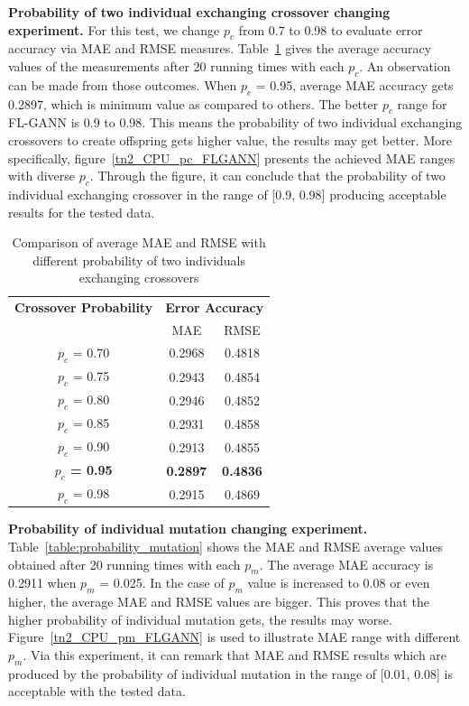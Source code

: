 \documentclass[conference]{IEEEtran}
\begin{document}
\textbf{Probability of two individual exchanging crossover changing experiment.} For this test, we change $p_c$ from 0.7 to 0.98 to evaluate error accuracy via MAE and RMSE measures. Table~\ref{table:probability_crossovers} gives the average accuracy values of the measurements after 20 running times with each $p_c$. An observation can be made from those outcomes. When $p_c$ = 0.95, average MAE accuracy gets 0.2897, which is minimum value as compared to others. The better $p_c$ range for FL-GANN is 0.9 to 0.98. This means the probability of two individual exchanging crossovers to create offspring gets higher value, the results may get better. More specifically, figure~\ref{tn2_CPU_pc_FLGANN} presents the achieved MAE ranges with diverse $p_c$. Through the figure, it can conclude that the probability of two individual exchanging crossover in the range of [0.9, 0.98] producing acceptable results for the tested data.

\begin{table}[h]
\caption{Comparison of average MAE and RMSE with different probability of two individuals exchanging crossovers} 
\begin{center}
\begin{tabular}{| c | c| c |}
\hline
\textbf{Crossover Probability} & \multicolumn{2}{c|}{\textbf{Error Accuracy}} \\ \cline{2-3} 
& MAE & RMSE \\ [0.5ex] \hline
$p_c$ = 0.70	& 0.2968	& 0.4818		\\ \hline
$p_c$ = 0.75	& 0.2943	& 0.4854	\\ \hline
$p_c$ = 0.80	& 0.2946	& 0.4852	\\ \hline
$p_c$ = 0.85	& 0.2931	& 0.4858	\\ \hline
$p_c$ = 0.90	& 0.2913	& 0.4855		\\ \hline
\textbf{$p_c$ = 0.95}	& \textbf{0.2897}	& \textbf{0.4836}	\\ \hline
$p_c$ = 0.98	& 0.2915	& 0.4869	\\ \hline
\end{tabular}
\label{table:probability_crossovers}
\end{center}
\end{table}

\textbf{Probability of individual mutation changing experiment.} Table~\ref{table:probability_mutation} shows the MAE and RMSE average values obtained after 20 running times with each $p_m$. The average MAE accuracy is 0.2911 when $p_m$ = 0.025. In the case of $p_m$ value is increased to 0.08 or even higher, the average MAE and RMSE values are bigger. This proves that the higher probability of individual mutation gets, the results may worse. Figure~\ref{tn2_CPU_pm_FLGANN} is used to illustrate MAE range with different $p_m$. Via this experiment, it can remark that MAE and RMSE results which are produced by the probability of individual mutation in the range of [0.01, 0.08] is acceptable with the tested data. 
\end{document}
